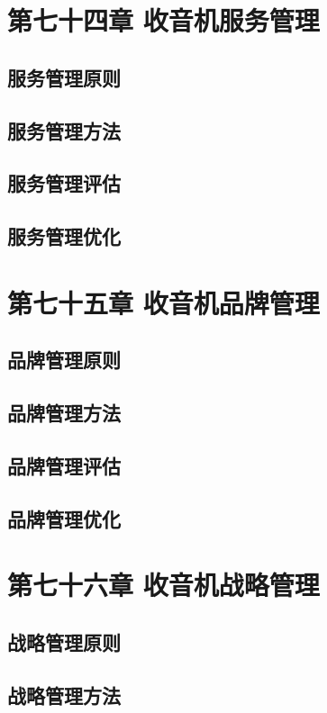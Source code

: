 \documentclass[12pt,UTF8]{ctexbook}
\begin{document}
\chapter{第七十四章 收音机服务管理}

\section{服务管理原则}
\section{服务管理方法}
\section{服务管理评估}
\section{服务管理优化}

\chapter{第七十五章 收音机品牌管理}

\section{品牌管理原则}
\section{品牌管理方法}
\section{品牌管理评估}
\section{品牌管理优化}

\chapter{第七十六章 收音机战略管理}

\section{战略管理原则}
\section{战略管理方法}
\end{document}
